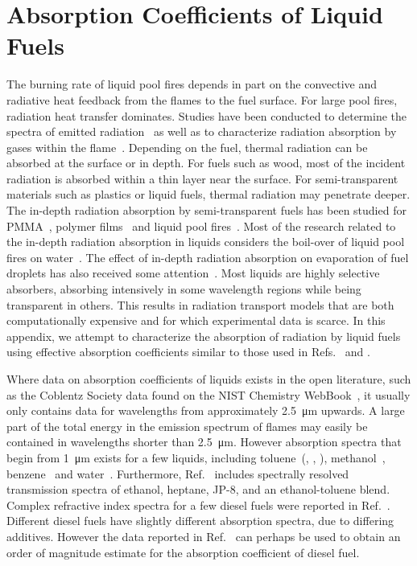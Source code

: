 \chapter{Absorption Coefficients of Liquid Fuels}
\label{app_abscoeff}

The burning rate of liquid pool fires depends in part on the convective and radiative heat feedback from the flames to the fuel surface. For large pool fires, radiation heat transfer dominates. Studies have been conducted to determine the spectra of emitted radiation~\cite{Suo-Anttila:PCT2009} as well as to characterize radiation absorption by gases within the flame~\cite{Wakatsuki:CST2008}. Depending on the fuel, thermal radiation can be absorbed at the surface or in depth. For fuels such as wood, most of the incident radiation is absorbed within a thin layer near the surface. For semi-transparent materials such as plastics or liquid fuels, thermal radiation may penetrate deeper. The in-depth radiation absorption by semi-transparent fuels has been studied for PMMA~\cite{Stoliarov:CF2009}, polymer films~\cite{Tsilingiris:ECM2003} and liquid pool fires~\cite{Suo-Anttila:PCT2009}. Most of the research related to the in-depth radiation absorption in liquids considers the boil-over of liquid pool fires on water~\cite{Broeckmann:JLPPI1995}. The effect of in-depth radiation absorption on evaporation of fuel droplets has also received some attention~\cite{Sazhin:IJHMT2004b}. Most liquids are highly selective absorbers, absorbing intensively in some wavelength regions while being transparent in others. This results in radiation transport models that are both computationally expensive and for which experimental data is scarce. In this appendix, we attempt to characterize the absorption of radiation by liquid fuels using effective absorption coefficients similar to those used in Refs.~\cite{Madhav:IJMP1995} and \cite{Manohar:JHT1995}.

Where data on absorption coefficients of liquids exists in the open literature, such as the Coblentz Society data found on the NIST Chemistry WebBook~\cite{Coblentz:1}, it usually  only contains data for wavelengths from approximately \SI{2.5}{\micro m} upwards. A large part of the total energy in the emission spectrum of flames may easily be contained in wavelengths shorter than \SI{2.5}{\micro m}. However absorption spectra that begin from \SI{1}{\micro m} exists for a few liquids, including toluene~(\cite{Bertie:JMS2005}, \cite{Bertie:AS1994b}, \cite{Bertie:AS1994a}), methanol~\cite{Bertie:AS1993a}, benzene~\cite{Bertie:AS1993b} and water~\cite{Bertie:AS1996}. Furthermore, Ref.~\cite{Suo-Anttila:PCT2009} includes spectrally resolved transmission spectra of ethanol, heptane, JP-8, and an ethanol-toluene blend. Complex refractive index spectra for a few diesel fuels were reported in Ref.~\cite{Sazhin:IJHMT2004b}. Different diesel fuels have slightly different absorption spectra, due to differing additives. However the data reported in Ref.~\cite{Sazhin:IJHMT2004b} can perhaps be used to obtain an order of magnitude estimate for the absorption coefficient of diesel fuel.

